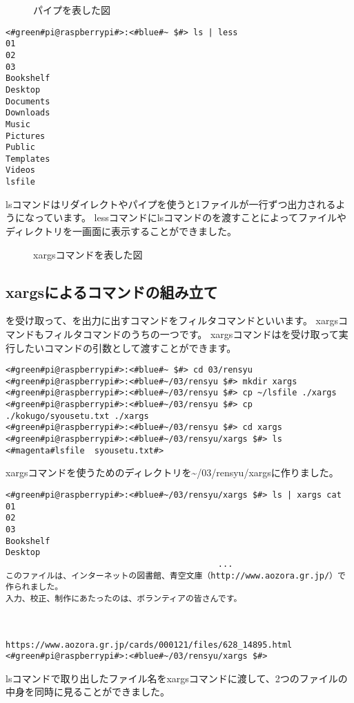 \begin{figure}
    \centering
    
    \caption{パイプを表した図}
    \label{ch03:pipe}
\end{figure}

\begin{lstlisting}[caption=lsコマンドの出力をパイプでlessコマンドに渡す, label=redirectCat]
<#green#pi@raspberrypi#>:<#blue#~ $#> ls | less
01
02
03
Bookshelf
Desktop
Documents
Downloads
Music
Pictures
Public
Templates
Videos
lsfile
\end{lstlisting}

lsコマンドはリダイレクトやパイプを使うと1ファイルが一行ずつ出力されるようになっています。
lessコマンドにlsコマンドのを渡すことによってファイルやディレクトリを一画面に表示することができました。

\newpage
\begin{figure}[t]
    \centering
    
    \caption{xargsコマンドを表した図}
    \label{ch03:xargs_command}
\end{figure}

\subsection{xargsによるコマンドの組み立て}

を受け取って、を出力に出すコマンドをフィルタコマンドといいます。
xargsコマンドもフィルタコマンドのうちの一つです。
xargsコマンドはを受け取って実行したいコマンドの引数として渡すことができます。

\begin{lstlisting}[caption=xargsコマンドを使う準備をする]
<#green#pi@raspberrypi#>:<#blue#~ $#> cd 03/rensyu
<#green#pi@raspberrypi#>:<#blue#~/03/rensyu $#> mkdir xargs
<#green#pi@raspberrypi#>:<#blue#~/03/rensyu $#> cp ~/lsfile ./xargs
<#green#pi@raspberrypi#>:<#blue#~/03/rensyu $#> cp ./kokugo/syousetu.txt ./xargs
<#green#pi@raspberrypi#>:<#blue#~/03/rensyu $#> cd xargs 
<#green#pi@raspberrypi#>:<#blue#~/03/rensyu/xargs $#> ls
<#magenta#lsfile  syousetu.txt#>
\end{lstlisting}
xargsコマンドを使うためのディレクトリを\textasciitilde /03/rensyu/xargsに作りました。

\newpage
\begin{lstlisting}[caption=xargsコマンドを使ってcatコマンドを使う]
<#green#pi@raspberrypi#>:<#blue#~/03/rensyu/xargs $#> ls | xargs cat
01
02
03
Bookshelf
Desktop
                                           ...
このファイルは、インターネットの図書館、青空文庫（http://www.aozora.gr.jp/）で作られました。
入力、校正、制作にあたったのは、ボランティアの皆さんです。



https://www.aozora.gr.jp/cards/000121/files/628_14895.html
<#green#pi@raspberrypi#>:<#blue#~/03/rensyu/xargs $#>
\end{lstlisting}
lsコマンドで取り出したファイル名をxargsコマンドに渡して、2つのファイルの中身を同時に見ることができました。

